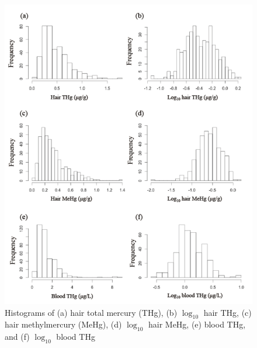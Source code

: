 \begin{figure}
  \centering
    \label{fig:Fig28}
  \includegraphics[scale=1]{Figures/Fig28.pdf}
  \caption[Histograms of (a) hair total mercury, (b) $\log_{10}$ hair total mercury, (c) hair methylmercury, (d) $\log_{10}$ hair methylmercury, (e) blood total mercury, and (f) $\log_{10}$ blood total mercury]{Histograms of (a) hair total mercury (THg), (b) $\log_{10}$ hair THg, (c) hair methylmercury (MeHg), (d) $\log_{10}$ hair MeHg, (e) blood THg, and (f) $\log_{10}$ blood THg}
\end{figure}

